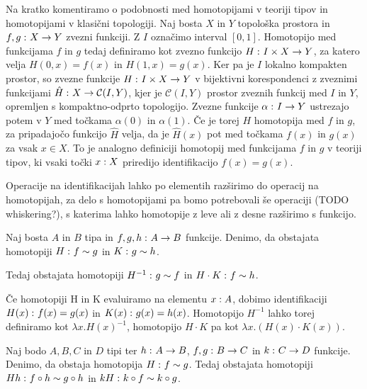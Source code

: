 \begin{opomba}
  Na kratko komentiramo o podobnosti med homotopijami v teoriji tipov in homotopijami v
  klasični topologiji. Naj bosta \(X\) in \(Y\) topološka prostora in
  \(f, g \,\colon X \to Y\) zvezni
  funkciji. Z \(I\) označimo interval \([0, 1]\). Homotopijo med funkcijama \(f\) in \(g\)
  tedaj definiramo kot zvezno funkcijo \(H \,\colon I \times X \to Y\), za katero velja
  \(H(0, x) = f(x)\) in \(H(1, x) = g(x)\). Ker pa je \(I\) lokalno kompakten prostor, so
  zvezne funkcije \(H \,\colon I \times X \to Y\) v bijektivni korespondenci z zveznimi funkcijami
  \(\hat{H} \,\colon X \to \mathcal{C}(I, Y)\), kjer je \(\mathcal{C}(I, Y)\) prostor zveznih funkcij med \(I\) in
  \(Y\), opremljen s kompaktno-odprto topologijo. Zvezne funkcije \(\alpha \,\colon I \to Y\)
  ustrezajo potem v \(Y\) med točkama \(\alpha(0)\) in \(\alpha(1)\). Če je torej \(H\)
  homotopija med \(f\) in \(g\), za pripadajočo funkcijo \(\hat{H}\) velja, da je
  \(\hat{H}(x)\) pot med točkama \(f(x)\) in \(g(x)\) za vsak \(x \in X\). To je analogno
  definiciji homotopij med funkcijama \(f\) in \(g\) v teoriji tipov, ki vsaki točki
  \(x : X\) priredijo identifikacijo \(f(x) = g(x)\).
\end{opomba}

Operacije na identifikacijah lahko po elementih razširimo do operacij na homotopijah,
za delo s homotopijami
pa bomo potrebovali še operaciji (TODO whiskering?), s katerima lahko homotopije z leve ali
z desne razširimo s funkcijo.

\begin{trditev}
  Naj bosta \(A\) in \(B\) tipa in \(f, g, h \,\colon A \to B\) funkcije. Denimo, da obstajata
  homotopiji \(H \,\colon f \sim g\) in \(K \,\colon g \sim h\).

  Tedaj obstajata homotopiji \(H^{-1} \,\colon g \sim f\) in \(H \cdot K \,\colon f \sim h\).
\end{trditev}

\begin{dokaz}
  Če homotopiji H in K evaluiramo na elementu \(x : A\), dobimo identifikaciji
  \(H(x) \,\colon f(x) = g(x)\) in \(K(x) \,\colon g(x) = h(x)\). Homotopijo \(H^{-1}\) lahko
  torej definiramo kot \(\lambda x. H(x)^{-1}\), homotopijo \(H \cdot K\) pa kot \(\lambda x.(H(x) \cdot K(x))\).
\end{dokaz}

\begin{trditev}
  Naj bodo \(A, B, C\) in \(D\) tipi ter \(h \,\colon A \to B\), \(f, g \,\colon B \to C\) in
  \(k \,\colon C \to D\) funkcije. Denimo, da obstaja homotopija \(H \,\colon f \sim g\).
  Tedaj obstajata homotopiji \(Hh \,\colon f \circ h \sim g \circ h\) in
  \(kH \,\colon k \circ f \sim k \circ g\).
\end{trditev}

